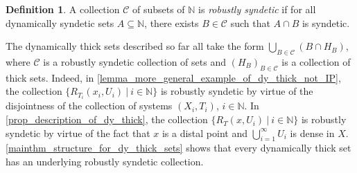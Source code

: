 \documentclass[letter,11pt]{article}
\theoremstyle{plain}
\theoremstyle{definition}
\newtheorem{definition}[theorem]{Definition}
\theoremstyle{plain}
\theoremstyle{plain}
\numberwithin{equation}{section}
\newcommand{\N}{\mathbb{N}}
\newcommand{\collection}{\mathscr{C}}
\begin{document}
\begin{definition}
\label{def_robust_syndetic}
A collection $\collection$ of subsets of $\N$ is \emph{robustly syndetic} if for all dynamically syndetic sets $A \subseteq \N$, there exists $B \in \collection$ such that $A \cap B$ is syndetic.
\end{definition}

The dynamically thick sets described so far all take the form $\bigcup_{B \in \collection} (B \cap H_B)$, where $\collection$ is a robustly syndetic collection of sets and $(H_B)_{B \in \collection}$ is a collection of thick sets.  Indeed, in \cref{lemma_more_general_example_of_dy_thick_not_IP}, the collection $\{R_{T_i}(x_i,U_i) \ | \ i \in \N\}$ is robustly syndetic by virtue of the disjointness of the collection of systems $(X_i, T_i)$, $i \in \N$.  In \cref{prop_description_of_dy_thick}, the collection $\{R_{T}(x,U_i) \ | \ i \in \N\}$ is robustly syndetic by virtue of the fact that $x$ is a distal point and $\bigcup_{i=1}^\infty U_i$ is dense in $X$.  \cref{mainthm_structure_for_dy_thick_sets} shows that every dynamically thick set has an underlying robustly syndetic collection.
\end{document}
